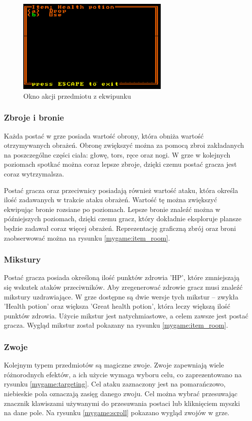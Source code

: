 \documentclass[12pt,twoside]{article}
\begin{document}
\FloatBarrier
\begin{figure}[h]
	\centering
	\includegraphics[width=75mm]{images/mygame/item_menu.png}
	\caption{Okno akcji przedmiotu z ekwipunku}
	\label{mygame:item_menu}
\end{figure}
\FloatBarrier

\subsubsection{Zbroje i bronie}
Każda postać w grze posiada wartość obrony, która obniża wartość otrzymywanych obrażeń. Obronę zwiększyć można za pomocą zbroi zakładanych na poszczególne części ciała: głowę, tors, ręce oraz nogi. W grze w kolejnych poziomach spotkać można coraz lepsze zbroje, dzięki czemu postać gracza jest coraz wytrzymalsza.

Postać gracza oraz przeciwnicy posiadają również wartość ataku, która określa ilość zadawanych w trakcie ataku obrażeń. Wartość tę można zwiększyć ekwipując bronie rozsiane po poziomach. Lepsze bronie znaleźć można w późniejszych poziomach, dzięki czemu gracz, który dokładnie eksploruje plansze będzie zadawał coraz więcej obrażeń. Reprezentację graficzną zbrój oraz broni zaobserwować można na rysunku \ref{mygame:item_room}.


\subsubsection{Mikstury}
Postać gracza posiada określoną ilość punktów zdrowia 'HP', które zmniejszają się wskutek ataków przeciwników. Aby zregenerować zdrowie gracz musi znaleźć mikstury uzdrawiające. W grze dostępne są dwie wersje tych mikstur -- zwykła 'Health potion' oraz większa 'Great health potion', która leczy większą ilość punktów zdrowia. Użycie mikstur jest natychmiastowe, a celem zawsze jest postać gracza. Wygląd mikstur został pokazany na rysunku \ref{mygame:item_room}.


\subsubsection{Zwoje}
Kolejnym typem przedmiotów są magiczne zwoje. Zwoje zapewniają wiele różnorodnych efektów, a ich użycie wymaga wyboru celu, co zaprezentowano na rysunku \ref{mygame:targeting}. Cel ataku zaznaczony jest na pomarańczowo, niebieskie pola oznaczają zasięg danego zwoju. Cel można wybrać przesuwając znacznik klawiszami używanymi do przesuwania postaci lub kliknięciem myszki na dane pole. Na rysunku \ref{mygame:scroll} pokazano wygląd zwojów w grze.
\end{document}
